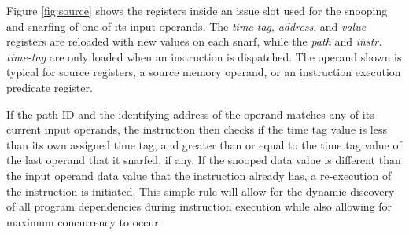 \documentclass{book}
\begin{document}
Figure \ref{fig:source} shows the registers inside an 
issue slot used for the snooping and snarfing of 
one of its input operands.  
The 
{\em time-tag},
{\em address}, and
{\em value} registers are reloaded with new values on each snarf,
while the
{\em path} and
{\em instr. time-tag} are only loaded when an instruction is
dispatched.
The operand shown is typical for source registers, a source memory
operand, or an instruction execution predicate register.
%
\begin{figure*}
\centerline{}
\caption[Instruction Source Operand]
{{\em Instruction Source Operand.} 
The registers and snooping
operation of one of several possible source operands is shown.
Just one operand forwarding bus is shown being snooped but
typically several operand forwarding buses are snooped simultaneously.}
\label{fig:source}
\end{figure*}
%

If the
path ID and the identifying address of the operand matches any of
its current input operands, the instruction then checks
if the time tag value is less than its own assigned time tag,
and greater than or equal to the time tag value of the last
operand that it snarfed, if any.  
If the snooped data value is
different than the input operand data value that the instruction 
already has, a re-execution of the instruction is initiated.
This simple rule will allow for the dynamic discovery of
all program dependencies during instruction execution while 
also allowing for maximum concurrency to occur.
%
%
\end{document}
